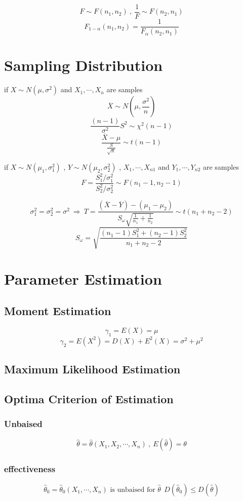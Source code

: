 \documentclass{ctexart}
\begin{document}
\[F\sim F(n_1,n_2)\ , \ \frac{1}{F}\sim F(n_2,n_1)\]
\[F_{1-\alpha}(n_1,n_2)=\frac{1}{F_\alpha(n_2,n_1)}\]

\newpage
\section{Sampling Distribution}
if \(X\sim N(\mu,\sigma^2)\) and \(X_1 ,\cdots ,X_n \) are samples 
\[\overline{X}\sim N(\mu ,\frac{\sigma^2}{n})\]
\[\frac{(n-1)}{\sigma^2}S^2\sim \chi^2(n-1)\]
\[\frac{\overline{X}-\mu}{\frac{S}{\sqrt{n}}}\sim t(n-1)\]


\vspace{12 pt}
if \(X\sim N(\mu_1,\sigma^2_1)\) , \(Y\sim N(\mu_2,\sigma_2^2)\) , \(X_1 ,\cdots ,X_{n1}\) and \(Y_1 , \cdots , Y_{n2}\) are samples
\[F=\frac{S_1^2/\sigma^2_1}{S_2^2/\sigma^2_2}\sim F(n_1-1,n_2-1)\]

\[\sigma^2_1=\sigma^2_2=\sigma^2\ \Rightarrow \ T=\frac{(\overline{X}-\overline{Y})-(\mu_1-\mu_2)}{S_{\omega}\sqrt{\frac{1}{n_1}+\frac{1}{n_2}}}\sim t(n_1+n_2-2)\]
\[S_\omega =\sqrt{\frac{(n_1-1)S_1^2+(n_2-1)S^2_2}{n_1+n_2-2}}\]

\newpage
\section{Parameter Estimation}
\subsection{Moment Estimation}
\[\gamma_1=E(X)=\mu\]
\[\gamma_2=E(X^2)=D(X)+E^2(X)=\sigma^2+\mu^2\]

\subsection{Maximum Likelihood Estimation}

\subsection{Optima Criterion of Estimation}
\subsubsection{Unbaised}
\[\hat{\theta}=\hat{\theta}(X_1,X_2,\cdots , X_n)\ , \ E(\hat{\theta})=\theta\]
\subsubsection{effectiveness}
\[\hat{\theta}_0=\hat{\theta}_0(X_1,\cdots ,X_n)\text{ is unbaised for }\hat{\theta}\ \ D(\hat{\theta}_0)\leq D(\hat{\theta})  \]
\end{document}
